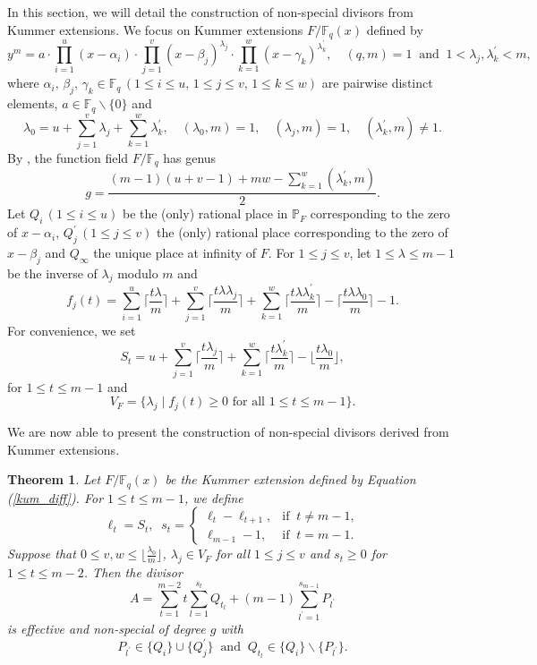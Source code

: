 \documentclass[journal,12pt,onecolumn]{IEEEtran}
\newtheorem{theorem}{Theorem}
\begin{document}
In this section, we will detail the construction of non-special divisors from Kummer extensions. We focus on Kummer extensions $F/\mathbb{F}_q(x)$ defined by
\begin{equation}\label{kum_diff}
    y^m=a\cdot\prod_{i=1}^u(x-\alpha_i)\cdot\prod_{j=1}^v(x-\beta_j)^{\lambda_j}\cdot\prod_{k=1}^w(x-\gamma_k)^{\lambda_k^\prime},\quad(q,m)=1\;\;\text{and}\;\;1<\lambda_j,\lambda_k^\prime<m,
\end{equation}
where $\alpha_i,\,\beta_j,\,\gamma_k\in\mathbb{F}_q \,(1\le i\le u,\,1\le j\le v,\,1\le k\le w)$ are pairwise distinct elements, $a\in\mathbb{F}_q\backslash\{0\}$ and 
\[
    \lambda_0=u+\sum_{j=1}^v\lambda_j+\sum_{k=1}^w\lambda_k^\prime,\quad(\lambda_0,m)=1,\quad(\lambda_j,m)=1,\quad (\lambda_k^\prime,m)\neq1.
\]
By \cite[Prop. 3.7.3]{Algebraic_Function_Fields_and_Codes}, the function field $F/\mathbb{F}_q$ has genus
\[
    g=\frac{(m-1)(u+v-1)+mw-\sum_{k=1}^w(\lambda_k^\prime,m)}{2}.
\]
Let $Q_i\,(1\le i\le u)$ be the (only) rational place in $\mathbb{P}_F$ corresponding to the zero of $x-\alpha_i$, $Q_j^\prime\,(1\le j\le v)$ the (only) rational place corresponding to the zero of $x-\beta_j$ and $Q_\infty$ the unique place at infinity of $F$. For $1\le j\le v$, let $1\le \lambda\le m-1$ be the inverse of $\lambda_j$ modulo $m$ and 
\[
    f_j(t) = \sum_{i=1}^u\bigg\lceil\frac{t\lambda}{m}\bigg\rceil +\sum_{j=1}^v\bigg\lceil\frac{t\lambda\lambda_j}{m}\bigg\rceil+\sum_{k=1}^w\bigg\lceil\frac{t\lambda\lambda_k^\prime}{m}\bigg\rceil-\bigg\lceil\frac{t\lambda\lambda_0}{m}\bigg\rceil - 1. 
\]
For convenience, we set
\[
    S_t = u+\sum_{j=1}^v\bigg\lceil\frac{t\lambda_j}{m}\bigg\rceil+\sum_{k=1}^w\bigg\lceil\frac{t\lambda_k^\prime}{m}\bigg\rceil-\bigg\lfloor\frac{t\lambda_0}{m}\bigg\rfloor,
\]
for $1\le t\le m-1$ and 
\[
    V_F = \{\lambda_j\mid f_j(t)\ge 0 \text{ for all }1\le t\le m-1\}. 
\]

We are now able to present the construction of non-special divisors derived from Kummer extensions.

\begin{theorem}\label{non-special_divisors_cons}
    Let $F/\mathbb{F}_q(x)$ be the Kummer extension defined by Equation (\ref{kum_diff}). For $1\le t\le m-1$, we define
    \[
        \ell_t=S_t,\;\;s_t=\begin{cases}
            \ell_t-\ell_{t+1}, &\text{if}\;\; t\neq m-1,\\
            \ell_{m-1}-1, &\text{if}\;\; t=m-1.
        \end{cases}
    \]
    Suppose that $0\le v,w\le \big\lfloor\frac{\lambda_0}{m}\big\rfloor$, $\lambda_j\in V_F$ for all $1\le j\le v$ and $s_t\ge0$ for $1\le t\le m-2$. Then the divisor 
    \[
        A=\sum_{t=1}^{m-2}t\sum_{l=1}^{s_t}Q_{t_l}+(m-1)\sum_{l^\prime=1}^{s_{m-1}}P_{l^\prime}
    \]
    is effective and non-special of degree $g$ with 
    \[
        P_{l^\prime}\in \{Q_i\}\cup\{Q_j^\prime\}\;\;\text{and}\;\;Q_{t_l}\in\{Q_i\}\backslash\{P_{l^\prime}\}.
    \]
\end{theorem}
\end{document}
